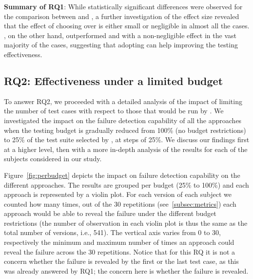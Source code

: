 \begin{tcolorbox}%
\textbf{Summary of RQ1}: While statistically significant differences were observed for the comparison between \ek and \fs, a further investigation of the effect size revealed that the effect of choosing \ek over \fs is either small or negligible in almost all the cases.
\fz, on the other hand, outperformed \ek and \fs with a non-negligible effect in the vast majority of the cases, suggesting that adopting \fz can help improving the testing effectiveness.
\end{tcolorbox}


\subsection{RQ2: Effectiveness under a limited budget}
\label{subsec:rq2}

To answer RQ2, we proceeded with a detailed analysis of the impact of limiting the number of test cases with respect to those that would be run by \ek. 
We investigated the impact on the failure detection capability of all the approaches 
when the testing budget is gradually reduced from 100\% (no budget restrictions) 
to 25\% of the test suite selected by \ek, at steps of 25\%.
%
We discuss our findings first at a higher level, then with a more in-depth analysis of the results for each of the subjects considered in our study.


Figure~\ref{fig:perbudget} depicts the impact on failure detection capability on the different approaches.
The results are grouped per budget 
(25\% to 100\%) 
and each approach is represented by a violin plot.
For each version of each subject 
we counted how many times, out of the 30 repetitions (see~\autoref{subsec:metrics})
each approach would be able to reveal the failure under the different budget restrictions 
(the number of observation in each violin plot is thus the same as the total number of versions, i.e., 541).
The vertical axis varies from 0 to 30, respectively the minimum and maximum number of times an approach could reveal the failure across the 30 repetitions.
Notice that for this RQ it is not a concern whether the failure is revealed by the first or the last test case, 
as this was already answered by RQ1; the  concern here is whether the failure is revealed.

